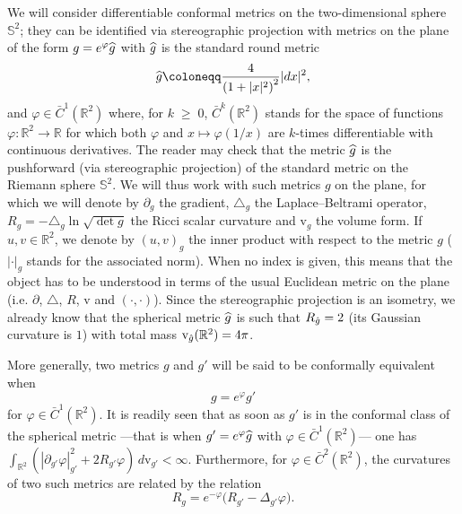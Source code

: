 \documentclass[AHL,Unicode,longabstracts,published]{cedram}
\renewcommand{\geq}{\;\geqslant\;}
\newcommand{\rmv}{\mathrm{v}}
\newcommand{\R}{\mathbb{R}}
\renewcommand*\S{\mathbb{S}}
\let\oldhat\hat
\renewcommand*{\hat}[1]{\mathchoice{\widehat{#1}}{\widehat{#1}}{\oldhat{#1}}{\oldhat{#1}}}
\begin{document}
We will consider differentiable conformal metrics on the two-dimensional sphere $\S^2$; they can be identified via stereographic projection with metrics on the plane of the form $g=e^{\varphi}\hat{g}$ with $\hat{g}$ is the standard round metric
\begin{equation}
\hat{g}\coloneqq \frac{4}{\left(1+|x|^2\right)^2}|dx|^2,
\end{equation}
and $\varphi\in\bar{C}^1(\R^2)$ where, for $k\geq 0$, $ \bar{C}^k(\R^2)$ stands for the space of functions $\varphi:\R^2\to\R$ for which both $\varphi$ and $x\mapsto\varphi (1/x)$ are $k$-times differentiable with continuous derivatives. The reader may check that the metric $ \hat{g}$ is the pushforward (via stereographic projection) of the standard metric on the Riemann sphere $\S^2$. We will thus work with such metrics $g$ on the plane, for which we will denote by $\partial_g$ the gradient, $\triangle_g$ the Laplace--Beltrami operator, $R_g=-\triangle_g\ln \sqrt{\det g}$ the Ricci scalar curvature and $\rmv_g$ the volume form. If $u,v\in\R^2$, we denote by $(u,v)_{g}$ the inner product with respect to the metric $g$ ($|\cdot |_{g}$ stands for the associated norm). When no index is given, this means that the object has to be understood in terms of the usual Euclidean metric on the plane (i.e. $\partial$, $\triangle$, $R$, $\rmv$ and $(\cdot,\cdot)$). Since the stereographic projection is an isometry, we already know that the spherical metric $\hat g$ is such that $R_{\hat g}=2$ (its Gaussian curvature is $1$) with total mass $\rmv_{\hat g}(\R^2)=4\pi$.

More generally, two metrics $g$ and $g'$ will be said to be conformally equivalent when
\[
g =e^{\varphi}g'
\]
for $\varphi \in \bar{C}^1(\R^2) $. It is readily seen that as soon as $g'$ is in the conformal class of the spherical metric ---that is when $g'=e^{\varphi}\hat g$ with $\varphi \in \bar{C}^1(\R^2) $--- one has ${\int_{\R^2}
(|\partial_{g'} \varphi|^2_{g'} + 2 R_{g'} \varphi) \,d\rmv_{g'} <\infty}$. Furthermore, for $\varphi \in \bar{C}^2(\R^2) $, the curvatures of two such metrics are related by the relation
\begin{equation}\label{curvature}
R_g=e^{-\varphi}\big(R_{g'}-\Delta_{g'}\varphi\big).
\end{equation}
\end{document}
